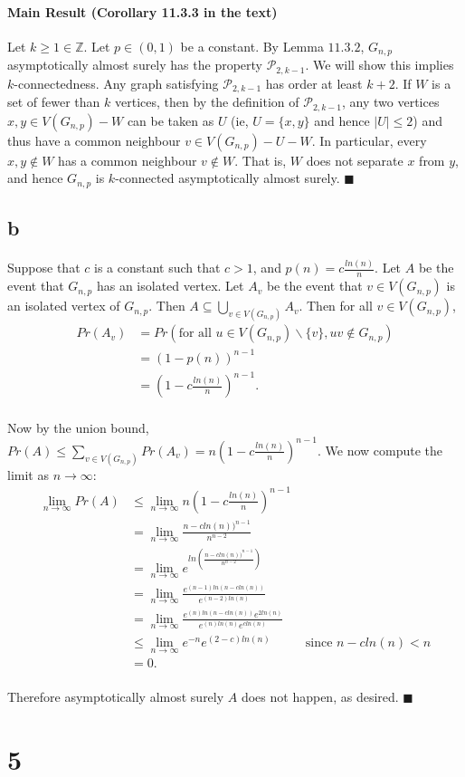 \documentclass[letterpaper,12pt,oneside,onecolumn]{report}
\begin{document}
\paragraph{Main Result (Corollary 11.3.3 in the text)}
Let $k \geq 1 \in \mathbb{Z}$. Let $p \in (0,1)$ be a constant. By Lemma $11.3.2$, $G_{n,p}$ asymptotically almost surely has the property $\mathcal{P}_{2,k-1}$. We will show this implies $k$-connectedness. Any graph satisfying $\mathcal{P}_{2,k-1}$ has order at least $k+2$.  If $W$ is a set of fewer than $k$ vertices, then by the definition of $\mathcal{P}_{2,k-1}$, any two vertices $x,y \in V(G_{n,p}) - W$ can be taken as $U$ (ie, $U = \{x,y\}$ and hence $|U| \leq 2$) and thus have a common neighbour $v \in V(G_{n,p}) - U - W$. In particular, every $x,y \not\in W$ has a common neighbour $v \not\in W$. That is, $W$ does not separate $x$ from $y$, and hence $G_{n,p}$ is $k$-connected asymptotically almost surely. $\blacksquare$
\subsection*{b}
\paragraph{}
Suppose that $c$ is a constant such that $c > 1$, and $p(n) = c\frac{ln(n)}{n}$. Let $A$ be the event that $G_{n,p}$ has an isolated vertex. Let $A_v$ be the event that $v \in V(G_{n,p})$ is an isolated vertex of $G_{n,p}$. Then $A \subseteq \bigcup_{v \in V(G_{n,p})} A_v$. Then for all $v \in V(G_{n,p})$,
\begin{align*}
Pr(A_v) &= Pr(\text{for all } u \in V(G_{n,p})\backslash \{v\}, uv \not\in G_{n,p}) \\
&= (1- p(n))^{n-1} \\
&= (1- c\frac{ln(n)}{n})^{n-1}.
\end{align*}
\paragraph{}
Now by the union bound, $Pr(A) \leq \sum_{v\in V(G_{n,p})} Pr(A_v) = n(1- c\frac{ln(n)}{n})^{n-1}$. We now compute the limit as $n \rightarrow \infty$:
\begin{align*}
\lim_{n \to \infty} Pr(A) &\leq \lim_{n\to \infty} n(1- c\frac{ln(n)}{n})^{n-1} \\
&= \lim_{n\to \infty} \frac{n-cln(n))^{n-1}}{n^{n-2}} \\
&=  \lim_{n\to \infty} e^{ln(\frac{n-cln(n))^{n-1}}{n^{n-2}})} \\
&=  \lim_{n\to \infty} \frac{e^{(n-1)ln(n - cln(n))}}{e^{(n-2)ln(n)}}\\
&=  \lim_{n\to \infty} \frac{e^{(n)ln(n - cln(n))}e^{2ln(n)}}{e^{(n)ln(n)}e^{cln(n)}}\\
&\leq \lim_{n\to \infty} e^{-n}e^{(2-c)ln(n)} &\text{ since $n-cln(n) < n$} \\
& = 0.
\end{align*}
\paragraph{}
Therefore asymptotically almost surely $A$ does not happen, as desired. $\blacksquare$
\section*{5}
\end{document}
